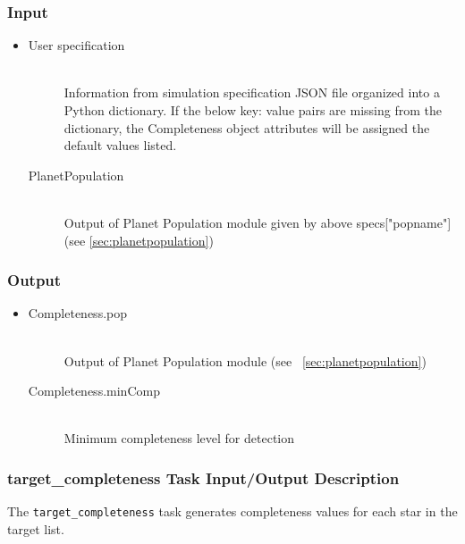 \documentclass[cleanfoot]{asme2ej}
\begin{document}
\subsubsection*{Input}
\begin{itemize}
    \item 
    \begin{description}
        \item[User specification] \hfill \\
        Information from simulation specification JSON file organized into a Python dictionary. If the below key: value pairs are missing from the dictionary, the Completeness object attributes will be assigned the default values listed.
        \item[PlanetPopulation] \hfill \\
        Output of Planet Population module given by above specs["popname"] (see \ref{sec:planetpopulation})
    \end{description}
    
\end{itemize}

\subsubsection*{Output}
\begin{itemize}
    \item 
    \begin{description}
        \item[Completeness.pop] \hfill \\
        Output of Planet Population module (see ~\ref{sec:planetpopulation})
        \item[Completeness.minComp] \hfill \\
        Minimum completeness level for detection
    \end{description}
\end{itemize}

\subsubsection{target\_completeness Task Input/Output Description}
\label{sec:targetcompletenesstask}
The \verb+target_completeness+ task generates completeness values for each star in the target list.
\end{document}
